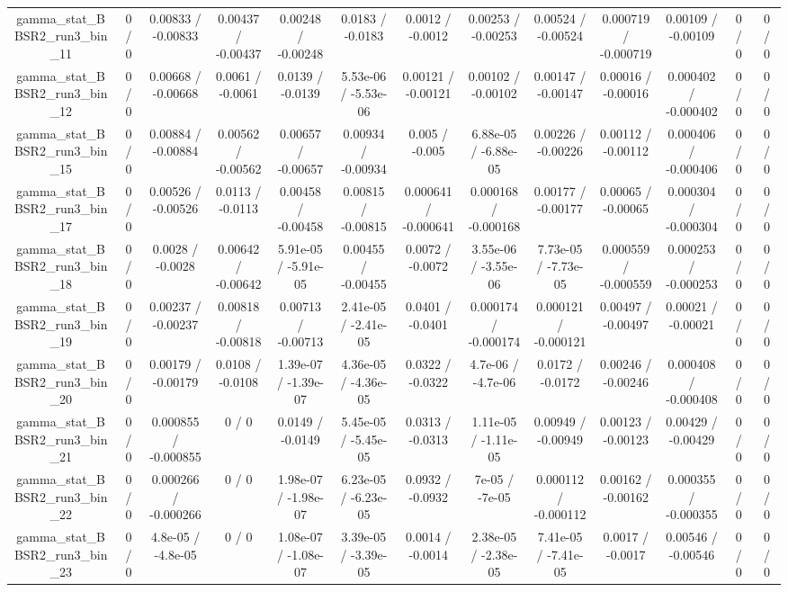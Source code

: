 \documentclass[10pt]{article}
\begin{document}
\begin{table}[htbp]
\begin{center}
\begin{tabular}{|c|c|c|c|c|c|c|c|c|c|c|c|c|}
  gamma_stat_BBSR2_run3_bin_11 & 0 / 0 & 0.00833 / -0.00833 & 0.00437 / -0.00437 & 0.00248 / -0.00248 & 0.0183 / -0.0183 & 0.0012 / -0.0012 & 0.00253 / -0.00253 & 0.00524 / -0.00524 & 0.000719 / -0.000719 & 0.00109 / -0.00109 & 0 / 0 & 0 / 0 \\ 
  gamma_stat_BBSR2_run3_bin_12 & 0 / 0 & 0.00668 / -0.00668 & 0.0061 / -0.0061 & 0.0139 / -0.0139 & 5.53e-06 / -5.53e-06 & 0.00121 / -0.00121 & 0.00102 / -0.00102 & 0.00147 / -0.00147 & 0.00016 / -0.00016 & 0.000402 / -0.000402 & 0 / 0 & 0 / 0 \\ 
  gamma_stat_BBSR2_run3_bin_15 & 0 / 0 & 0.00884 / -0.00884 & 0.00562 / -0.00562 & 0.00657 / -0.00657 & 0.00934 / -0.00934 & 0.005 / -0.005 & 6.88e-05 / -6.88e-05 & 0.00226 / -0.00226 & 0.00112 / -0.00112 & 0.000406 / -0.000406 & 0 / 0 & 0 / 0 \\ 
  gamma_stat_BBSR2_run3_bin_17 & 0 / 0 & 0.00526 / -0.00526 & 0.0113 / -0.0113 & 0.00458 / -0.00458 & 0.00815 / -0.00815 & 0.000641 / -0.000641 & 0.000168 / -0.000168 & 0.00177 / -0.00177 & 0.00065 / -0.00065 & 0.000304 / -0.000304 & 0 / 0 & 0 / 0 \\ 
  gamma_stat_BBSR2_run3_bin_18 & 0 / 0 & 0.0028 / -0.0028 & 0.00642 / -0.00642 & 5.91e-05 / -5.91e-05 & 0.00455 / -0.00455 & 0.0072 / -0.0072 & 3.55e-06 / -3.55e-06 & 7.73e-05 / -7.73e-05 & 0.000559 / -0.000559 & 0.000253 / -0.000253 & 0 / 0 & 0 / 0 \\ 
  gamma_stat_BBSR2_run3_bin_19 & 0 / 0 & 0.00237 / -0.00237 & 0.00818 / -0.00818 & 0.00713 / -0.00713 & 2.41e-05 / -2.41e-05 & 0.0401 / -0.0401 & 0.000174 / -0.000174 & 0.000121 / -0.000121 & 0.00497 / -0.00497 & 0.00021 / -0.00021 & 0 / 0 & 0 / 0 \\ 
  gamma_stat_BBSR2_run3_bin_20 & 0 / 0 & 0.00179 / -0.00179 & 0.0108 / -0.0108 & 1.39e-07 / -1.39e-07 & 4.36e-05 / -4.36e-05 & 0.0322 / -0.0322 & 4.7e-06 / -4.7e-06 & 0.0172 / -0.0172 & 0.00246 / -0.00246 & 0.000408 / -0.000408 & 0 / 0 & 0 / 0 \\ 
  gamma_stat_BBSR2_run3_bin_21 & 0 / 0 & 0.000855 / -0.000855 & 0 / 0 & 0.0149 / -0.0149 & 5.45e-05 / -5.45e-05 & 0.0313 / -0.0313 & 1.11e-05 / -1.11e-05 & 0.00949 / -0.00949 & 0.00123 / -0.00123 & 0.00429 / -0.00429 & 0 / 0 & 0 / 0 \\ 
  gamma_stat_BBSR2_run3_bin_22 & 0 / 0 & 0.000266 / -0.000266 & 0 / 0 & 1.98e-07 / -1.98e-07 & 6.23e-05 / -6.23e-05 & 0.0932 / -0.0932 & 7e-05 / -7e-05 & 0.000112 / -0.000112 & 0.00162 / -0.00162 & 0.000355 / -0.000355 & 0 / 0 & 0 / 0 \\ 
  gamma_stat_BBSR2_run3_bin_23 & 0 / 0 & 4.8e-05 / -4.8e-05 & 0 / 0 & 1.08e-07 / -1.08e-07 & 3.39e-05 / -3.39e-05 & 0.0014 / -0.0014 & 2.38e-05 / -2.38e-05 & 7.41e-05 / -7.41e-05 & 0.0017 / -0.0017 & 0.00546 / -0.00546 & 0 / 0 & 0 / 0 \\ 

\end{tabular}
\end{center}
\end{table}
\end{document}
